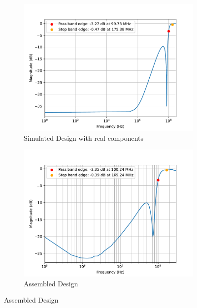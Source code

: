 \documentclass[letterpaper,12pt]{article}
\begin{document}
\begin{figure}[H]
    \medskip
  
    \begin{subfigure}[t]{.49\textwidth}
      \centering
      \includegraphics[width=\linewidth]{figures/7.real}
      \caption{Simulated Design with real components}
    \end{subfigure}
    \hfill
    \begin{subfigure}[t]{.49\textwidth}
      \centering
      \includegraphics[width=\linewidth]{figures/7.assembled}
      \caption{Assembled Design}
    \end{subfigure}
  \end{figure}

\newpage
\end{document}
